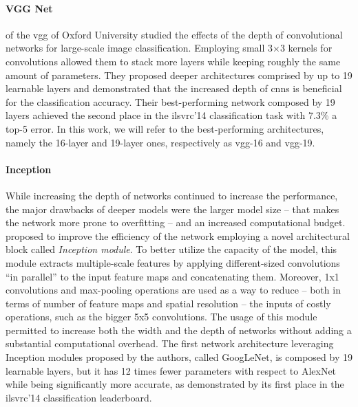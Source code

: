 \paragraph{VGG Net} %
\citet{simonyan2014very} of the \gls{vgg} of Oxford University studied the effects of the depth of convolutional networks for large-scale image classification.
Employing small 3$\times$3 kernels for convolutions allowed them to stack more layers while keeping roughly the same amount of parameters.
They proposed deeper architectures comprised by up to 19 learnable layers and demonstrated that the increased depth of \glspl{cnn} is beneficial for the classification accuracy.
Their best-performing network composed by 19 layers achieved the second place in the \gls{ilsvrc}'14 classification task with $7.3 \%$ a top-5 error.
In this work, we will refer to the best-performing architectures, namely the 16-layer and 19-layer ones, respectively as \gls{vgg}-16 and \gls{vgg}-19.

\paragraph{Inception}
While increasing the depth of networks continued to increase the performance, the major drawbacks of deeper models were the larger model size -- that makes the network more prone to overfitting -- and an increased computational budget.
\citet{szegedy2015going} proposed to improve the efficiency of the network employing a novel architectural block called \emph{Inception module}.
To better utilize the capacity of the model, this module extracts multiple-scale features by applying different-sized convolutions ``in parallel'' to the input feature maps and concatenating them.
Moreover, 1x1 convolutions and max-pooling operations are used as a way to reduce -- both in terms of number of feature maps and spatial resolution -- the inputs of costly operations, such as the bigger 5x5 convolutions.
The usage of this module permitted to increase both the width and the depth of networks without adding a substantial computational overhead.
The first network architecture leveraging Inception modules proposed by the authors, called GoogLeNet, is composed by 19 learnable layers, but it has 12 times fewer parameters with respect to AlexNet while being significantly more accurate, as demonstrated by its first place in the \gls{ilsvrc}'14 classification leaderboard.


